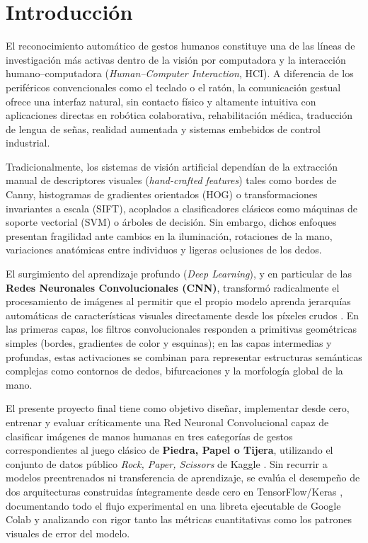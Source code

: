 
\section{Introducción}

El reconocimiento automático de gestos humanos constituye una de las líneas de investigación más activas dentro de la visión por computadora y la interacción humano--computadora (\textit{Human--Computer Interaction}, HCI). A diferencia de los periféricos convencionales como el teclado o el ratón, la comunicación gestual ofrece una interfaz natural, sin contacto físico y altamente intuitiva con aplicaciones directas en robótica colaborativa, rehabilitación médica, traducción de lengua de señas, realidad aumentada y sistemas embebidos de control industrial.

Tradicionalmente, los sistemas de visión artificial dependían de la extracción manual de descriptores visuales (\textit{hand-crafted features}) tales como bordes de Canny, histogramas de gradientes orientados (HOG) o transformaciones invariantes a escala (SIFT), acoplados a clasificadores clásicos como máquinas de soporte vectorial (SVM) o árboles de decisión. Sin embargo, dichos enfoques presentan fragilidad ante cambios en la iluminación, rotaciones de la mano, variaciones anatómicas entre individuos y ligeras oclusiones de los dedos.

El surgimiento del aprendizaje profundo (\textit{Deep Learning}), y en particular de las \textbf{Redes Neuronales Convolucionales (CNN)}, transformó radicalmente el procesamiento de imágenes al permitir que el propio modelo aprenda jerarquías automáticas de características visuales directamente desde los píxeles crudos \cite{LeCun1998, Krizhevsky2012, Goodfellow2016}. En las primeras capas, los filtros convolucionales responden a primitivas geométricas simples (bordes, gradientes de color y esquinas); en las capas intermedias y profundas, estas activaciones se combinan para representar estructuras semánticas complejas como contornos de dedos, bifurcaciones y la morfología global de la mano.

El presente proyecto final tiene como objetivo diseñar, implementar desde cero, entrenar y evaluar críticamente una Red Neuronal Convolucional capaz de clasificar imágenes de manos humanas en tres categorías de gestos correspondientes al juego clásico de \textbf{Piedra, Papel o Tijera}, utilizando el conjunto de datos público \textit{Rock, Paper, Scissors} de Kaggle \cite{Freeman2019}. Sin recurrir a modelos preentrenados ni transferencia de aprendizaje, se evalúa el desempeño de dos arquitecturas construidas íntegramente desde cero en TensorFlow/Keras \cite{Abadi2015, Chollet2021}, documentando todo el flujo experimental en una libreta ejecutable de Google Colab y analizando con rigor tanto las métricas cuantitativas como los patrones visuales de error del modelo.

